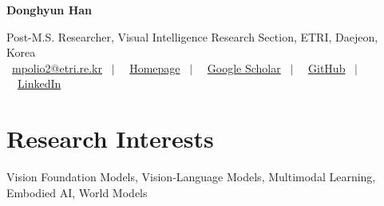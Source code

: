 \documentclass[a4paper,11pt]{article}
\newcommand{\headerfontiii}{\fontfamily{ppl}\selectfont} %
\begin{document}
\headerfontiii

\begin{center}
    {\LARGE\textbf{Donghyun Han}}
\end{center}
\vspace{-6mm}

\begin{center}
    \small{
    Post-M.S. Researcher, Visual Intelligence Research Section, ETRI, Daejeon, Korea \\
    \faEnvelope\ \href{mailto:mpolio2@etri.re.kr}{mpolio2@etri.re.kr} \ $\vert$ \
    \faHome\ \href{https://donghyun99.github.io/cv/}{Homepage} \ $\vert$ \
    \faGraduationCap\ \href{https://scholar.google.com/citations?user=nJieBt0AAAAJ&hl=en}{Google Scholar} \ $\vert$ \
    \faGithub\ \href{https://github.com/DongHyun99}{GitHub} \ $\vert$ \
    \faLinkedin\ \href{https://www.linkedin.com/in/donghyun99/}{LinkedIn}
    }
\end{center}
\vspace{-6mm}

\section{\textbf{Research Interests}}
\vspace{1mm}
\small{
Vision Foundation Models,
Vision-Language Models,
Multimodal Learning,
Embodied AI,
World Models
}
\vspace{-2mm}
\end{document}
